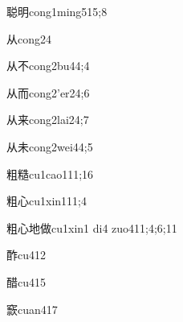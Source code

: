 \begin{verbete}{聪明}{cong1ming5}{15;8}
\end{verbete}

\begin{verbete}{从}{cong2}{4}
\end{verbete}

\begin{verbete}{从不}{cong2bu4}{4;4}
\end{verbete}

\begin{verbete}{从而}{cong2'er2}{4;6}
\end{verbete}

\begin{verbete}{从来}{cong2lai2}{4;7}
\end{verbete}

\begin{verbete}{从未}{cong2wei4}{4;5}
\end{verbete}

\begin{verbete}{粗糙}{cu1cao1}{11;16}
\end{verbete}

\begin{verbete}{粗心}{cu1xin1}{11;4}
\end{verbete}

\begin{verbete}{粗心地做}{cu1xin1 di4 zuo4}{11;4;6;11}
\end{verbete}

\begin{verbete}{酢}{cu4}{12}
\end{verbete}

\begin{verbete}{醋}{cu4}{15}
\end{verbete}

\begin{verbete}{窾}{cuan4}{17}
\end{verbete}

